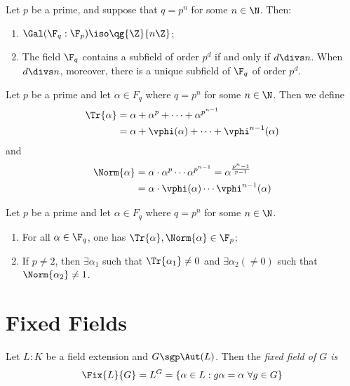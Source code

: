 \documentclass{article}
\begin{document}
\begin{ttheorem}
  Let \( p \) be a prime, and suppose that \( q=p^{n} \) for some \( n\in\N \).
  Then: \begin{enumerate}[label=(\alph*)]
    \item \( \Gal(\F_q:\F_p)\iso \qg{\Z}{n\Z} \);
    \item The field \( \F_q \) contains a subfield of order \( p^d \) if and only if \( d\divs n \).
      When \( d\divs n \), moreover, there is a unique subfield of \( \F_q \) of order \( p^d \).
  \end{enumerate}
\end{ttheorem}

\begin{tdefinition}
  Let \( p \) be a prime and let \( \alpha\in F_q \) where \( q=p^{n} \) for some \( n\in\N \).
  Then we define
  \begin{align*}
    \Tr{\alpha} &= \alpha+\alpha^p + \cdots + \alpha^{p^{n-1}} \\
    &= \alpha + \vphi(\alpha) + \cdots + \vphi^{n-1}(\alpha)
  \end{align*}
  and
  \begin{align*}
    \Norm{\alpha} &= \alpha\cdot\alpha^p  \cdots  \alpha^{p^{n-1}} = \alpha^{\frac{p^{n}-1}{p-1}} \\
    &= \alpha\cdot \vphi(\alpha)\cdots \vphi^{n-1}(\alpha)
  \end{align*}
\end{tdefinition}

\begin{tlemma}
  Let \( p \) be a prime and let \( \alpha\in F_q \) where \( q=p^{n} \) for some \( n\in\N \).
  \begin{enumerate}
    \item For all \( \alpha\in \F_q \), one has \( \Tr{\alpha},\Norm{\alpha}\in \F_p \);
    \item If \( p\neq 2 \), then \( \exists\alpha_1 \) such that \( \Tr{\alpha_1}\neq 0 \) and \( \exists \alpha_2(\neq 0) \) such that \( \Norm{\alpha_2}\neq 1 \).
  \end{enumerate}
\end{tlemma}

\section{Fixed Fields}
\begin{tdefinition}
  Let \( L:K \) be a field extension and \( G\sgp \Aut(L) \). Then the \it{fixed field} of \( G \) is \begin{align*}
    \Fix{L}{G} = L^G = \{\alpha\in L : g\alpha= \alpha\ \forall g\in G\}
  \end{align*}
\end{tdefinition}
\end{document}
